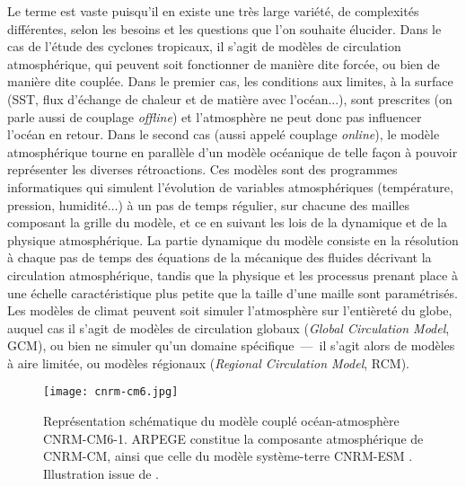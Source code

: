 \documentclass[../main.tex]{subfiles}
\begin{document}
Le terme  est vaste puisqu'il en existe une très large variété, de complexités différentes, selon les besoins et les questions que
l'on souhaite élucider. Dans le cas de l'étude des cyclones tropicaux, il s'agit de modèles de circulation atmosphérique, qui peuvent soit fonctionner de
manière dite forcée, ou bien de manière dite couplée. Dans le premier cas, les conditions aux limites, à la surface (SST, flux d'échange de chaleur et de
matière avec l'océan...), sont prescrites (on parle aussi de couplage \textit{offline}) et l'atmosphère ne peut donc pas influencer l'océan en retour. Dans le
second cas (aussi appelé couplage \textit{online}), le modèle atmosphérique tourne en parallèle d'un modèle océanique de telle façon à pouvoir représenter les
diverses rétroactions. Ces modèles sont des programmes informatiques qui simulent l'évolution de variables atmosphériques (température, pression, humidité...) à
un pas de temps régulier, sur chacune des mailles composant la grille du modèle, et ce en suivant les lois de la dynamique et de la physique atmosphérique. La
partie dynamique du modèle consiste en la résolution à chaque pas de temps des équations de la mécanique des fluides décrivant la circulation atmosphérique,
tandis que la physique et les processus prenant place à une échelle caractéristique plus petite que la taille d'une maille sont paramétrisés. Les modèles de
climat peuvent soit simuler l'atmosphère sur l'entièreté du globe, auquel cas il s'agit de modèles de circulation globaux (\textit{Global Circulation Model},
GCM), ou bien ne simuler qu'un domaine spécifique~---~il s'agit alors de modèles à aire limitée, ou modèles régionaux (\textit{Regional Circulation Model},
RCM).

\begin{figure}[t]
    \centering
    \texttt{[image: cnrm-cm6.jpg]}
    \caption{Représentation schématique du modèle couplé océan-atmosphère CNRM-CM6-1. \hbox{ARPEGE} constitue la composante atmosphérique de CNRM-CM, ainsi que
    celle du modèle système-terre CNRM-ESM \parencite{seferian_evaluation_2019}. Illustration issue de \textcite{voldoire_evaluation_2019}.}
    \label{fig:cnrm-cm6}
\end{figure}
\end{document}
